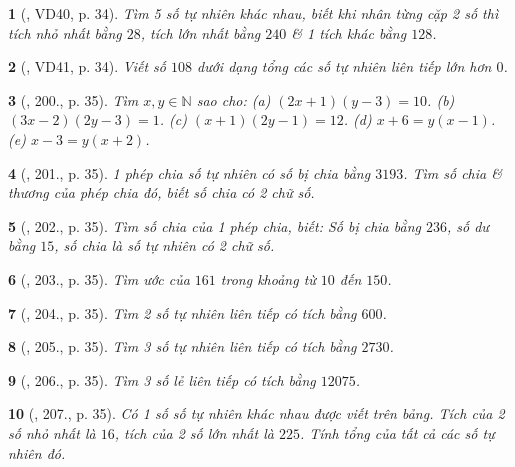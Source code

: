 \documentclass{article}
\newtheorem{baitoan}{}
\begin{document}
\begin{baitoan}[\cite{Binh_Toan_6_tap_1}, VD40, p. 34]
	Tìm 5 số tự nhiên khác nhau, biết khi nhân từng cặp 2 số thì tích nhỏ nhất bằng $28$, tích lớn nhất bằng $240$ \& 1 tích khác bằng $128$.
\end{baitoan}

\begin{baitoan}[\cite{Binh_Toan_6_tap_1}, VD41, p. 34]
	Viết số $108$ dưới dạng tổng các số tự nhiên liên tiếp lớn hơn $0$.
\end{baitoan}

\begin{baitoan}[\cite{Binh_Toan_6_tap_1}, 200., p. 35]
	Tìm $x,y\in\mathbb{N}$ sao cho: (a) $(2x + 1)(y - 3) = 10$. (b) $(3x - 2)(2y - 3) = 1$. (c) $(x + 1)(2y - 1) = 12$. (d) $x + 6 = y(x - 1)$. (e) $x - 3 = y(x + 2)$.
\end{baitoan}

\begin{baitoan}[\cite{Binh_Toan_6_tap_1}, 201., p. 35]
	1 phép chia số tự nhiên có số bị chia bằng $3193$. Tìm số chia \& thương của phép chia đó, biết số chia có 2 chữ số.
\end{baitoan}

\begin{baitoan}[\cite{Binh_Toan_6_tap_1}, 202., p. 35]
	Tìm số chia của 1 phép chia, biết: Số bị chia bằng $236$, số dư bằng $15$, số chia là số tự nhiên có 2 chữ số.
\end{baitoan}	

\begin{baitoan}[\cite{Binh_Toan_6_tap_1}, 203., p. 35]
	Tìm ước của $161$ trong khoảng từ $10$ đến $150$.
\end{baitoan}

\begin{baitoan}[\cite{Binh_Toan_6_tap_1}, 204., p. 35]
	Tìm 2 số tự nhiên liên tiếp có tích bằng $600$.
\end{baitoan}

\begin{baitoan}[\cite{Binh_Toan_6_tap_1}, 205., p. 35]
	Tìm 3 số tự nhiên liên tiếp có tích bằng $2730$.
\end{baitoan}

\begin{baitoan}[\cite{Binh_Toan_6_tap_1}, 206., p. 35]
	Tìm 3 số lẻ liên tiếp có tích bằng $12075$.
\end{baitoan}

\begin{baitoan}[\cite{Binh_Toan_6_tap_1}, 207., p. 35]
	Có 1 số số tự nhiên khác nhau được viết trên bảng. Tích của 2 số nhỏ nhất là $16$, tích của 2 số lớn nhất là $225$. Tính tổng của tất cả các số tự nhiên đó.
\end{baitoan}
\end{document}
